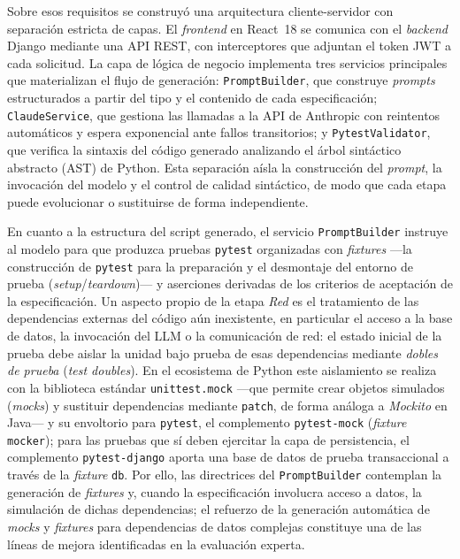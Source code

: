 \documentclass[10pt,journal,twoside,letterpaper]{IEEEtran}
\begin{document}
	Sobre esos requisitos se construyó una arquitectura cliente-servidor con separación estricta de capas. El \emph{frontend} en React~18 se comunica con el \emph{backend} Django mediante una API REST, con interceptores que adjuntan el token JWT a cada solicitud. La capa de lógica de negocio implementa tres servicios principales que materializan el flujo de generación: \texttt{PromptBuilder}, que construye \emph{prompts} estructurados a partir del tipo y el contenido de cada especificación; \texttt{ClaudeService}, que gestiona las llamadas a la API de Anthropic con reintentos automáticos y espera exponencial ante fallos transitorios; y \texttt{PytestValidator}, que verifica la sintaxis del código generado analizando el árbol sintáctico abstracto (AST) de Python. Esta separación aísla la construcción del \emph{prompt}, la invocación del modelo y el control de calidad sintáctico, de modo que cada etapa puede evolucionar o sustituirse de forma independiente.
	
	En cuanto a la estructura del script generado, el servicio \texttt{PromptBuilder} instruye al modelo para que produzca pruebas \texttt{pytest} organizadas con \emph{fixtures} ---la construcción de \texttt{pytest} para la preparación y el desmontaje del entorno de prueba (\emph{setup}/\emph{teardown})--- y aserciones derivadas de los criterios de aceptación de la especificación. Un aspecto propio de la etapa \emph{Red} es el tratamiento de las dependencias externas del código aún inexistente, en particular el acceso a la base de datos, la invocación del LLM o la comunicación de red: el estado inicial de la prueba debe aislar la unidad bajo prueba de esas dependencias mediante \emph{dobles de prueba} (\emph{test doubles}). En el ecosistema de Python este aislamiento se realiza con la biblioteca estándar \texttt{unittest.mock} ---que permite crear objetos simulados (\emph{mocks}) y sustituir dependencias mediante \texttt{patch}, de forma análoga a \emph{Mockito} en Java--- y su envoltorio para \texttt{pytest}, el complemento \texttt{pytest-mock} (\emph{fixture} \texttt{mocker}); para las pruebas que sí deben ejercitar la capa de persistencia, el complemento \texttt{pytest-django} aporta una base de datos de prueba transaccional a través de la \emph{fixture} \texttt{db}. Por ello, las directrices del \texttt{PromptBuilder} contemplan la generación de \emph{fixtures} y, cuando la especificación involucra acceso a datos, la simulación de dichas dependencias; el refuerzo de la generación automática de \emph{mocks} y \emph{fixtures} para dependencias de datos complejas constituye una de las líneas de mejora identificadas en la evaluación experta.
	
\end{document}
